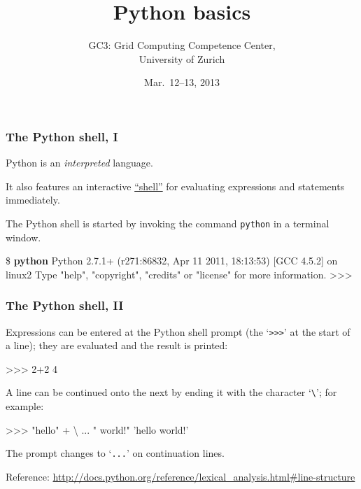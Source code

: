 \documentclass[english,serif,mathserif,xcolor=pdftex,dvipsnames,table]{beamer}
\title{%
  Python basics
}
\author[GC3]{%
  GC3: Grid Computing Competence Center, \\
  University of Zurich
}
\date{Mar.~12--13, 2013}
\begin{document}
\maketitle


\begin{frame}[fragile]
  \frametitle{The Python shell, I}
  Python is an \emph{interpreted} language.

  \+
  It also features an interactive
  \href{http://en.wikipedia.org/wiki/REPL}{``shell''} for evaluating
  expressions and statements immediately.

  \+
  The Python shell is started by invoking the command
  \texttt{python} in a terminal window.
\begin{semiverbatim}\small
\$ \textbf{python}
Python 2.7.1+ (r271:86832, Apr 11 2011, 18:13:53)
[GCC 4.5.2] on linux2
Type "help", "copyright", "credits" or "license"
for more information.
>>>
\end{semiverbatim}
\end{frame}

\begin{frame}[fragile]
  \frametitle{The Python shell, II} Expressions can be entered at the
  Python shell prompt (the `\texttt{>>>}' at the start of a line);
  they are evaluated and the result is printed:
\begin{semiverbatim}
>>> 2+2
4
\end{semiverbatim}

  \+
  A line can be continued onto the next by ending it with the
  character `\texttt{\textbackslash}'; for example:
\begin{semiverbatim}
>>> "hello" + \textbackslash
... " world!"
'hello world!'
\end{semiverbatim}
  The prompt changes to `\texttt{...}' on continuation lines.

  \+\scriptsize
  Reference:
  \url{http://docs.python.org/reference/lexical_analysis.html#line-structure}
\end{frame}
\end{document}
